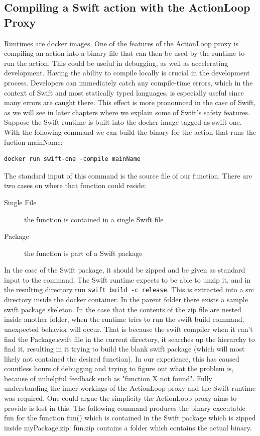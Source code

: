\subsection{Compiling a Swift action with the ActionLoop Proxy}
Runtimes are docker images. One of the features of the ActionLoop proxy is compiling an action into a binary file that can then be used by the runtime to run the action. This could be useful in debugging, as well as accelerating development.
Having the ability to compile locally is crucial in the development process. Developers can immediately catch any compile-time errors, which in the context of Swift and most statically typed languages, is especially useful since many errors are caught there. This effect is more pronounced in the case of Swift, as we will see in later chapters where we explain some of Swift's safety features.
Suppose the Swift runtime is built into the docker image tagged as swift-one. With the following command we can build the binary for the action that runs the fuction mainName:
\begin{verbatim}
docker run swift-one -compile mainName
\end{verbatim}
The standard input of this command is the source file of our function. There are two cases on where that function could reside:
\begin{description}
	\item [Single File] the function is contained in a single Swift file
	\item [Package] the function is part of a Swift package
\end{description}
In the case of the Swift package, it should be zipped and be given as standard input to the command. The Swift runtime expects to be able to unzip it, and in the resulting directory run \texttt{swift build -c release}. This is extracted into a src directory inside the docker container. In the parent folder there exists a sample swift package skeleton. In the case that the contents of the zip file are nested inside another folder, when the runtime tries to run the swift build command, unexpected behavior will occur. That is because the swift compiler when it can't find the Package.swift file in the current directory, it searches up the hierarchy to find it, resulting in it trying to build the blank swift package (which will most likely not contained the desired function). In our experience, this has caused countless hours of debugging and trying to figure out what the problem is, because of unhelpful feedback such as "function X not found". Fully understanding the inner workings of the ActionLoop proxy and the Swift runtime was required. One could argue the simplicity the ActionLoop proxy aims to provide is lost in this.
The following command produces the binary executable fun for the function fun() which is contained in the Swift package which is zipped inside myPackage.zip:
fun.zip contains a folder which contains the actual binary.


